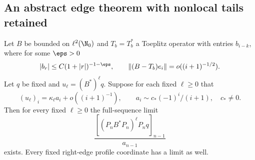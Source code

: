 \subsection{An abstract edge theorem with nonlocal tails retained}
\begin{theorem}\label{thm:edge}
Let $B$ be bounded on $\ell^2(\N_0)$ and $T_b=T_b^*$ a Toeplitz
operator with entries $b_{i-k}$, where for some $\eps>0$
\[
 |b_r|\le C(1+|r|)^{-1-\eps},\qquad
 \|(B-T_b)e_i\|=o((i+1)^{-1/2}).
\]
Let $q$ be fixed and $u_\ell=(B^*)^\ell q$. Suppose for each fixed
$\ell\ge0$ that
\[
 (u_\ell)_i=\kappa_\ell a_i+o((i+1)^{-1}),\qquad
 a_i\sim c_*( -1)^i/(i+1),\quad c_*\ne0.
\]
Then for every fixed $\ell\ge0$ the full-sequence limit
\[
 \frac{[(P_nB^*P_n)^\ell P_nq]_{n-1}}{a_{n-1}}
\]
exists. Every fixed right-edge profile coordinate has a limit as well.
\end{theorem}
